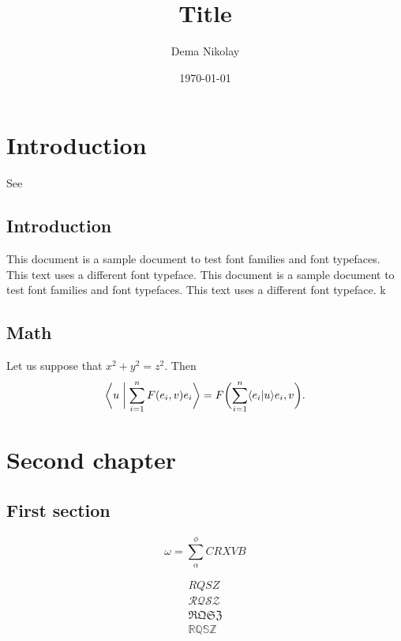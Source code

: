 \documentclass{nreport}
\title{Title}
\author{Dema Nikolay}
\date{\today}
\begin{document}
\maketitle
\tableofcontents

\chapter{Introduction}

See 

\lipsum[1]

\section{Introduction}

This document is a sample document to test font families and font typefaces. This text uses a different font typeface. This document is a sample document to test font families and font typefaces. This text uses a different font typeface. k

\lipsum[2]

\section{Math}

Let us suppose that $x^2+y^2=z^2$. Then
\begin{equation}
\biggl\langle u\biggm|\sum_{i=1}^nF(e_i,v)e_i\biggr\rangle
    =F\biggl(\sum_{i=1}^n\langle e_i|u\rangle e_i,v\biggr).
\end{equation}

\chapter{Second chapter}\label{ch2}

\lipsum[3]

\section{First section}

\lipsum[4]

$$
\omega = \sum_\alpha^\phi {CRXVB}
$$

\begin{align*}
RQSZ \\
\mathcal{RQSZ} \\
\mathfrak{RQSZ} \\
\mathbb{RQSZ}
\end{align*}
\end{document}
